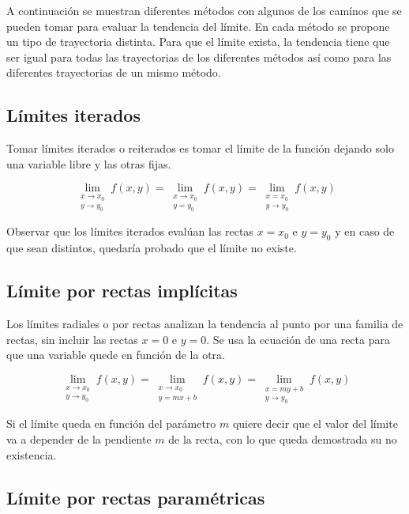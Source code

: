 \documentclass[a5paper,12pt,twoside]{book}
\begin{document}
A continuación se muestran diferentes métodos con algunos de los camínos que se pueden tomar para evaluar la tendencia del límite. En cada método se propone un tipo de trayectoria distinta. Para que el límite exista, la tendencia tiene que ser igual para todas las trayectorias de los diferentes métodos así como para las diferentes trayectorias de un mismo método.


\subsection{Límites iterados}

Tomar límites iterados o reiterados es tomar el límite de la función dejando solo una variable libre y las otras fijas.

\begin{equation*}
    \lim_{\substack{x \to x_0\\y \to y_0}} f(x,y)
    = \lim_{\substack{x \to x_0\\y = y_0}} f(x,y)
    = \lim_{\substack{x = x_0\\y \to y_0}} f(x,y)
\end{equation*}

Observar que los límites iterados evalúan las rectas $x=x_0$ e $y=y_0$ y en caso de que sean distintos, quedaría probado que el límite no existe.

\subsection{Límite por rectas implícitas}

Los límites radiales o por rectas analizan la tendencia al punto por una familia de rectas, sin incluir las rectas $x=0$ e $y=0$. Se usa la ecuación de una recta para que una variable quede en función de la otra.

\begin{equation*}
    \lim_{\substack{x \to x_0\\y \to y_0}} f(x,y)
    = \lim_{\substack{x \to x_0\\y=mx+b}} f(x,y)
    = \lim_{\substack{x=my+b\\y \to y_0}} f(x,y)
\end{equation*}

Si el límite queda en función del parámetro $m$ quiere decir que el valor del límite va a depender de la pendiente $m$ de la recta, con lo que queda demostrada su no existencia.


\subsection{Límite por rectas paramétricas}
\end{document}
